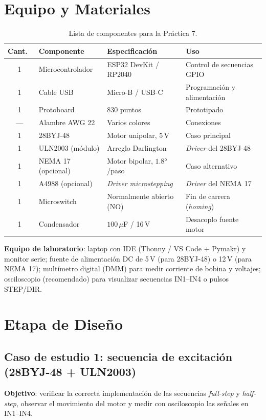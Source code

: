 \documentclass[11pt]{article}
\begin{document}
\section{Equipo y Materiales}
\begin{table}[H]\centering
\caption{Lista de componentes para la Práctica 7.}
\begin{tabular}{clll}
\toprule
Cant.\ & Componente & Especificación & Uso \\
\midrule
1 & Microcontrolador & ESP32 DevKit / RP2040 & Control de secuencias GPIO \\
1 & Cable USB & Micro-B / USB-C & Programación y alimentación \\
1 & Protoboard & 830 puntos & Prototipado \\
--- & Alambre AWG 22 & Varios colores & Conexiones \\
1 & 28BYJ-48 & Motor unipolar, 5\,V & Caso principal \\
1 & ULN2003 (módulo) & Arreglo Darlington & \emph{Driver} del 28BYJ-48 \\
1 & NEMA 17 (opcional) & Motor bipolar, $1.8\si{\degree}$/paso & Caso alternativo \\
1 & A4988 (opcional) & \emph{Driver} \emph{microstepping} & \emph{Driver} del NEMA 17 \\
1 & Microswitch & Normalmente abierto (NO) & Fin de carrera (\emph{homing}) \\
1 & Condensador & $100\,\mu$F / 16\,V & Desacoplo fuente motor \\
\bottomrule
\end{tabular}
\end{table}
\textbf{Equipo de laboratorio}: laptop con IDE (Thonny / VS Code + Pymakr) y monitor
serie; fuente de alimentación DC de 5\,V (para 28BYJ-48) o 12\,V (para NEMA 17);
multímetro digital (DMM) para medir corriente de bobina y voltajes; osciloscopio
(recomendado) para visualizar secuencias IN1--IN4 o pulsos STEP/DIR.

\section{Etapa de Diseño}

\subsection{Caso de estudio 1: secuencia de excitación (28BYJ-48 + ULN2003)}
\textbf{Objetivo}: verificar la correcta implementación de las secuencias
\emph{full-step} y \emph{half-step}, observar el movimiento del motor y medir con
osciloscopio las señales en IN1--IN4.
\end{document}
